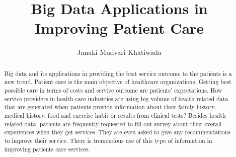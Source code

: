 \documentclass[sigconf]{acmart}
\begin{document}
\title{Big Data Applications in Improving Patient Care}


\author{Janaki Mudvari Khatiwada}



\begin{abstract}
 Big data and its applications in providing the best service outcome to the patients is a new trend. Patient care is the 
 main objective of healthcare organizations. Getting best possible care in terms of costs and service outcome are 
 patients' expectations. How service providers in health-care industries are using big volume of health related data 
 that are generated when patients provide information about their family history, medical history, food and exercise habit or 
 results from clinical tests? Besides health related data, patients are frequently requested to fill out  survey about their overall 
 experiences when they get services. They are even asked to give any recommendations to improve their service. There is tremendous use of this type of information in improving patients care services.
\end{abstract}


\maketitle
\end{document}

